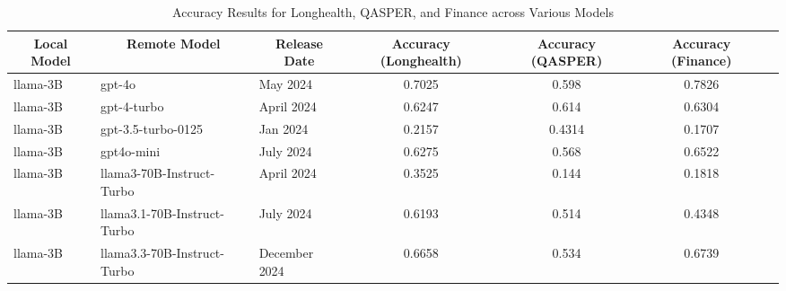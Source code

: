 \begin{table*}[]
\centering
\scriptsize

\begin{tabular}{l l l c c c c}
\toprule
\multicolumn{1}{c}{\textbf{Local Model}} & \multicolumn{1}{c}{\textbf{Remote Model}} & \multicolumn{1}{c}{\textbf{Release Date}} & \multicolumn{1}{c}{\textbf{Accuracy (Longhealth)}} & \multicolumn{1}{c}{\textbf{Accuracy (QASPER)}} & \multicolumn{1}{c}{\textbf{Accuracy (Finance)}} \\ 
\midrule
llama-3B & gpt-4o & May 2024 & 0.7025 & 0.598 & 0.7826 \\ 
llama-3B & gpt-4-turbo & April 2024 & 0.6247 & 0.614 & 0.6304 \\ 
llama-3B & gpt-3.5-turbo-0125 & Jan  2024 & 0.2157 & 0.4314 & 0.1707 \\ 
llama-3B & gpt4o-mini & July 2024 & 0.6275 & 0.568 & 0.6522 \\ 
llama-3B & llama3-70B-Instruct-Turbo & April 2024 & 0.3525 & 0.144 & 0.1818 \\ 
llama-3B & llama3.1-70B-Instruct-Turbo & July 2024 & 0.6193 & 0.514 & 0.4348 \\ 
llama-3B & llama3.3-70B-Instruct-Turbo & December 2024 & 0.6658 & 0.534 & 0.6739 \\ 
\bottomrule
\end{tabular}
\caption{Accuracy Results for Longhealth, QASPER, and Finance across Various Models}
\label{tab:remote-model-variations}
\end{table*}